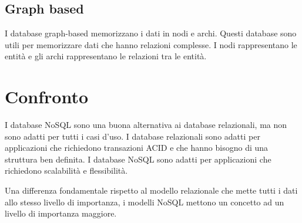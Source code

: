 \subsection{Graph based}
I database graph-based memorizzano i dati in nodi e archi. Questi database sono
utili per memorizzare dati che hanno relazioni complesse. I nodi rappresentano
le entità e gli archi rappresentano le relazioni tra le entità.
\section{Confronto}
I database NoSQL sono una buona alternativa ai database relazionali, ma non
sono adatti per tutti i casi d'uso. I database relazionali sono adatti per
applicazioni che richiedono transazioni ACID e che hanno bisogno di una
struttura ben definita. I database NoSQL sono adatti per applicazioni che
richiedono scalabilità e flessibilità.

Una differenza fondamentale rispetto al modello relazionale che mette tutti i 
dati allo stesso livello di importanza, i modelli NoSQL mettono un concetto ad 
un livello di importanza maggiore.